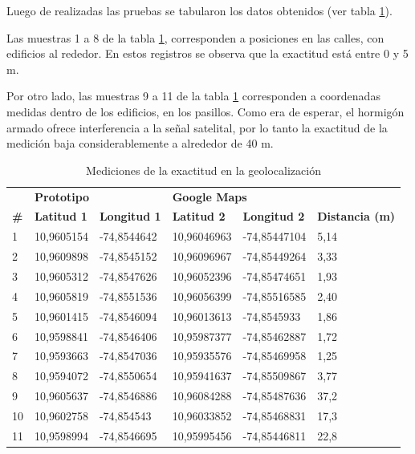 Luego de realizadas las pruebas se tabularon los datos obtenidos (ver tabla \ref{tabla:distancias_calculadas}). 

Las muestras 1 a 8 de la tabla \ref{tabla:distancias_calculadas}, corresponden a posiciones en las calles, con edificios al rededor. En estos registros se observa que la exactitud está entre 0 y 5 m.

Por otro lado, las muestras 9 a 11 de la tabla \ref{tabla:distancias_calculadas} corresponden a coordenadas medidas dentro de los edificios, en los pasillos. Como era de esperar, el hormigón armado ofrece interferencia a la señal satelital, por lo tanto la exactitud de la medición baja considerablemente a alrededor de 40 m.

\begin{table}[h]
    \centering
    \caption{Mediciones de la exactitud en la geolocalización}
    \begin{tabular}{p{.7cm} p{2cm} p{2.2cm} p{2cm} p{2.3cm} p{2.2cm}}
    \toprule
        & \multicolumn{2}{p{4.2cm}}{\textbf{Prototipo}} & \multicolumn{2}{p{4.3cm}}{\textbf{Google Maps}} &    \\
        \textbf{\#} & \textbf{Latitud 1} & \textbf{Longitud 1} & \textbf{Latitud 2} & \textbf{Longitud 2} & \textbf{Distancia (m)} \\
    \midrule
        1 & 10,9605154 & -74,8544642 & 10,96046963 & -74,85447104 & 5,14 \\
        2 & 10,9609898 & -74,8545152 & 10,96096967 & -74,85449264 & 3,33 \\
        3 & 10,9605312 & -74,8547626 & 10,96052396 & -74,85474651 & 1,93 \\
        4 & 10,9605819 & -74,8551536 & 10,96056399 & -74,85516585 & 2,40 \\
        5 & 10,9601415 & -74,8546094 & 10,96013613 & -74,8545933 & 1,86 \\
        6 & 10,9598841 & -74,8546406 & 10,95987377 & -74,85462887 & 1,72 \\
        7 & 10,9593663 & -74,8547036 & 10,95935576 & -74,85469958 & 1,25 \\
        8 & 10,9594072 & -74,8550654 & 10,95941637 & -74,85509867 & 3,77 \\
        9 & 10,9605637 & -74,8546886 & 10,96084288 & -74,85487636 & 37,2 \\
		10 & 10,9602758 &  -74,854543 & 10,96033852 & -74,85468831 & 17,3 \\        
        11 & 10,9598994 & -74,8546695 & 10,95995456 & -74,85446811 & 22,8 \\
    \bottomrule
    \end{tabular}
    \label{tabla:distancias_calculadas}
\end{table}

 


